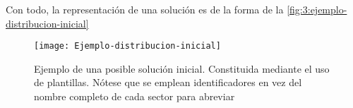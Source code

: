Con todo, la representación de una solución es de la forma de la \autoref{fig:3:ejemplo-distribucion-inicial}


\begin{figure}[htbp]
	\centering
	\texttt{[image: Ejemplo-distribucion-inicial]}
	\caption[Ejemplo de una solución inicial]{Ejemplo de una posible solución inicial. Constituida mediante el uso 
		de plantillas. 
		Nótese que se emplean identificadores en vez del nombre completo de cada sector para abreviar}
	\label{fig:3:ejemplo-distribucion-inicial}
\end{figure}





